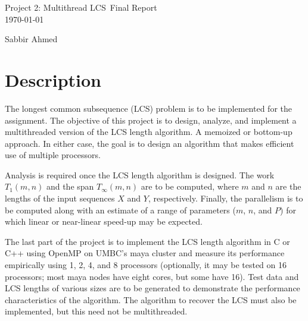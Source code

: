\documentclass[usletter, 11pt]{extarticle}
\newcommand{\project}{Project 2: Multithread LCS}
\newcommand{\members}{Sabbir Ahmed}
\begin{document}
    \begin{titlepage}

        \vspace*{\fill} %
        \begin{center}

            {\LARGE \project~Final Report}\\ [1.5cm]

            \today

            \vspace*{\fill}

            \members

        \end{center}
        \vspace*{\fill} %

    \end{titlepage}

    \section{Description} The longest common subsequence (LCS) problem is to be
    implemented for the assignment. The objective of this project is to design,
    analyze, and implement a multithreaded version of the LCS length algorithm.
    A memoized or bottom-up approach. In either case, the goal is to design an
    algorithm that makes efficient use of multiple processors.

    Analysis is required once the LCS length algorithm is designed. The work
    $T_{1}(m, n)$ and the span $T_{\infty}(m, n)$ are to be computed, where $m$
    and $n$ are the lengths of the input sequences $X$ and $Y$, respectively.
    Finally, the parallelism is to be computed along with an estimate of a
    range of parameters ($m$, $n$, and $P$) for which linear or near-linear
    speed-up may be expected.

    The last part of the project is to implement the LCS length algorithm in C
    or C++ using OpenMP on UMBC's maya cluster and measure its performance
    empirically using 1, 2, 4, and 8 processors (optionally, it may be tested
    on 16 processors; most maya nodes have eight cores, but some have 16). Test
    data and LCS lengths of various sizes are to be generated to demonstrate
    the performance characteristics of the algorithm. The algorithm to recover
    the LCS must also be implemented, but this need not be multithreaded.
\end{document}
